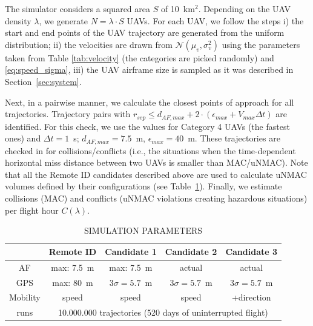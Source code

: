\documentclass[10pt,conference]{IEEEtran}
\begin{document}
The simulator considers a squared  area $S$ of 10~km$^2$. Depending on the UAV density $\lambda$, we generate $N=\lambda\cdot S$ UAVs. For each UAV, we follow the steps i) the start and end points of the UAV trajectory are generated from the uniform distribution; ii) the velocities are drawn from $\mathcal{N}(\mu_v,\sigma^2_v)$ using the parameters taken from Table \ref{tab:velocity} (the categories are picked randomly) and \eqref{eq:speed_sigma}, iii) the UAV airframe size is sampled as it was described in Section~\ref{sec:system}.

Next, in a pairwise manner, we calculate the closest points of approach for all trajectories. Trajectory pairs with $r_{sep}\leq d_{AF, max} + 2\cdot(\epsilon_{max} + V_{max} \Delta t)$ are identified. For this check, we use the values for Category 4 UAVs (the fastest ones) and $\Delta t = 1$~s; $d_{AF, max}=7.5$~m, $\epsilon_{max}=40$~m. These trajectories are checked in for collisions/conflicts (i.e., the situations when the time-dependent horizontal miss distance between two UAVs is smaller than MAC/uNMAC). Note that all the Remote ID candidates described above are used to calculate uNMAC volumes defined by their configurations (see Table~\ref{tab:sim}). 
Finally, we estimate collisions (MAC) and conflicts (uNMAC violations creating hazardous situations) per flight hour $C(\lambda)$. %

\begin{table}[h]
    \centering
        \caption{SIMULATION PARAMETERS}
    \begin{tabular}{c|c|c|c|c}
        &Remote ID &Candidate 1&Candidate 2&Candidate 3\\
        \hline
        AF& max: 7.5~m&max: 7.5~m&actual&actual\\
        GPS& max: 80~m& $3\sigma=5.7$~m&$3\sigma=5.7$~m&$3\sigma=5.7$~m\\
        Mobility& speed &speed&speed&+direction\\
        \hline
       runs&\multicolumn{4}{c}{10.000.000 trajectories (520 days of uninterrupted flight)}
    \end{tabular}
    \label{tab:sim}
\end{table}
\end{document}
